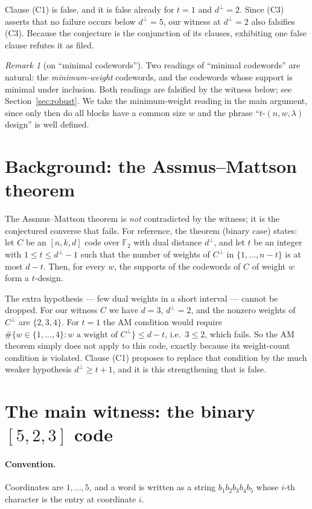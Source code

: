 \documentclass[11pt]{article}
\theoremstyle{definition}
\theoremstyle{remark}
\newtheorem{remark}[theorem]{Remark}
\newcommand{\F}{\mathbb{F}}
\newcommand{\dperp}{d^{\perp}}
\begin{document}
Clause (C1) is false, and it is false already for $t=1$ and $\dperp = 2$. Since
(C3) asserts that no failure occurs below $\dperp = 5$, our witness at
$\dperp = 2$ also falsifies (C3). Because the conjecture is the conjunction of
its clauses, exhibiting one false clause refutes it as filed.

\begin{remark}[on ``minimal codewords'']
Two readings of ``minimal codewords'' are natural: the \emph{minimum-weight}
codewords, and the codewords whose support is minimal under inclusion. Both
readings are falsified by the witness below; see
Section~\ref{sec:robust}. We take the minimum-weight reading in the main
argument, since only then do all blocks have a common size $w$ and the phrase
``$t$-$(n,w,\lambda)$ design'' is well defined.
\end{remark}

\section{Background: the Assmus--Mattson theorem}

The Assmus--Mattson theorem is \emph{not} contradicted by the witness; it is
the conjectured converse that fails. For reference, the theorem (binary case)
states: let $C$ be an $[n,k,d]$ code over $\F_2$ with dual distance $\dperp$,
and let $t$ be an integer with $1 \le t \le \dperp - 1$ such that the number of
weights of $C^{\perp}$ in $\{1,\dots,n-t\}$ is at most $d-t$. Then, for every
$w$, the supports of the codewords of $C$ of weight $w$ form a $t$-design.

The extra hypothesis --- few dual weights in a short interval --- cannot be
dropped. For our witness $C$ we have $d = 3$, $\dperp = 2$, and the nonzero
weights of $C^{\perp}$ are $\{2,3,4\}$. For $t = 1$ the AM condition would
require $\#\{w \in \{1,\dots,4\} : w \text{ a weight of } C^{\perp}\} \le d-t$,
i.e.\ $3 \le 2$, which fails. So the AM theorem simply does not apply to this
code, exactly because its weight-count condition is violated. Clause (C1)
proposes to replace that condition by the much weaker hypothesis
$\dperp \ge t+1$, and it is this strengthening that is false.

\section{The main witness: the binary $[5,2,3]$ code}

\paragraph{Convention.} Coordinates are $1,\dots,5$, and a word is written as a
string $b_1b_2b_3b_4b_5$ whose $i$-th character is the entry at coordinate $i$.
\end{document}
